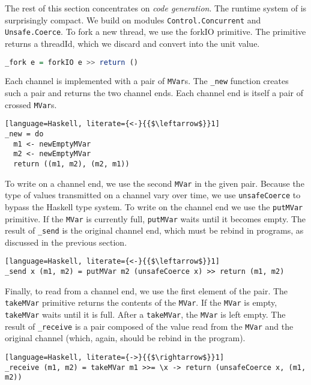 The rest of this section concentrates on \emph{code generation}.
%
The runtime system of \freest{} is surprisingly compact. We build on
modules \lstinline|Control.Concurrent| and
\lstinline|Unsafe.Coerce|.
%
To fork a new thread, we use the forkIO primitive. The primitive
returns a threadId, which we discard and convert into the unit value.
%
\begin{lstlisting}[language=Haskell]
_fork e = forkIO e >> return ()
\end{lstlisting}

Each channel is implemented with a pair of \lstinline|MVar|s. The
\lstinline|_new| function creates such a pair and returns the two
channel ends. Each channel end is itself a pair of crossed
\lstinline|MVar|s.
%
\begin{lstlisting}[language=Haskell, literate={<-}{{$\leftarrow$}}1]
_new = do
  m1 <- newEmptyMVar
  m2 <- newEmptyMVar
  return ((m1, m2), (m2, m1))
\end{lstlisting}

To write on a channel end, we use the second \lstinline|MVar| in the
given pair. Because the type of values transmitted on a channel vary
over time, we use \lstinline|unsafeCoerce| to bypass the Haskell type
system. To write on the channel end we use the \lstinline|putMVar|
primitive. If the \lstinline|MVar| is currently full,
\lstinline|putMVar| waits until it becomes empty.  The result of
\lstinline|_send| is the original channel end, which must be rebind in
programs, as discussed in the previous section.
%
\begin{lstlisting}[language=Haskell, literate={<-}{{$\leftarrow$}}1]
_send x (m1, m2) = putMVar m2 (unsafeCoerce x) >> return (m1, m2)
\end{lstlisting}

Finally, to read from a channel end, we use the first element of the
pair. The \lstinline|takeMVar| primitive returns the contents of the
\lstinline|MVar|. If the \lstinline|MVar| is empty,
\lstinline|takeMVar| waits until it is full. After a
\lstinline|takeMVar|, the \lstinline|MVar| is left empty. The result
of \lstinline|_receive| is a pair composed of the value read from the
\lstinline|MVar| and the original channel (which, again, should be
rebind in the program).
%
\begin{lstlisting}[language=Haskell, literate={->}{{$\rightarrow$}}1]
_receive (m1, m2) = takeMVar m1 >>= \x -> return (unsafeCoerce x, (m1, m2))
\end{lstlisting}

